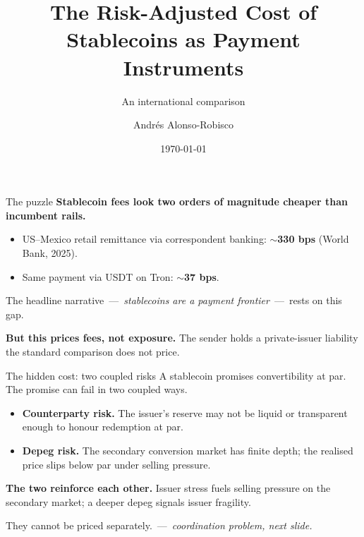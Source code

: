 \documentclass[aspectratio=169,11pt]{beamer}
\title[Risk-adjusted stablecoin cost]{The Risk-Adjusted Cost of Stablecoins as Payment Instruments}
\subtitle{An international comparison}
\author[A. Alonso-Robisco]{Andrés Alonso-Robisco}
\institute[BdE]{Banco de España}
\date{\today}
\begin{document}
\begin{frame}[plain]
\titlepage
\end{frame}

\begin{frame}{The puzzle}
\textbf{Stablecoin fees look two orders of magnitude cheaper than incumbent rails.}

\bigskip

\begin{itemize}
  \item US--Mexico retail remittance via correspondent banking: \textbf{$\sim$330 bps} (World Bank, 2025).
  \item Same payment via USDT on Tron: \textbf{$\sim$37 bps}.
\end{itemize}

\smallskip
The headline narrative \,---\, \emph{stablecoins are a payment frontier} \,---\, rests on this gap.

\bigskip

\textbf{But this prices fees, not exposure.} The sender holds a private-issuer liability the standard comparison does not price.
\end{frame}

\begin{frame}{The hidden cost: two coupled risks}
A stablecoin promises convertibility at par. The promise can fail in two coupled ways.

\bigskip

\begin{itemize}
  \item \textbf{Counterparty risk.} The issuer's reserve may not be liquid or transparent enough to honour redemption at par.
  \item \textbf{Depeg risk.} The secondary conversion market has finite depth; the realised price slips below par under selling pressure.
\end{itemize}

\bigskip

\textbf{The two reinforce each other.} Issuer stress fuels selling pressure on the secondary market; a deeper depeg signals issuer fragility.

\bigskip

They cannot be priced separately. \,---\, \emph{coordination problem, next slide.}
\end{frame}
\end{document}
